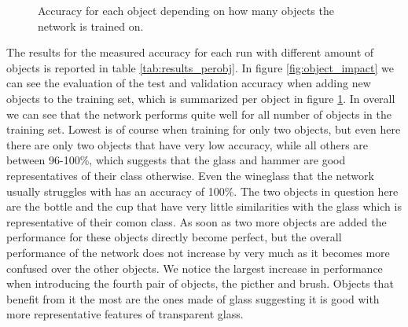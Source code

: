 \begin{figure}
	
	\caption{Accuracy for each object depending on how many objects the network is trained on.}
	\label{fig:object_impact_heatmap}
\end{figure}

The results for the measured accuracy for each run with different amount of objects is reported in table \ref{tab:results_perobj}. In figure \ref{fig:object_impact} we can see the evaluation of the test and validation accuracy when adding new objects to the training set, which is summarized per object in figure \ref{fig:object_impact_heatmap}. In overall we can see that the network performs quite well for all number of objects in the training set. Lowest is of course when training for only two objects, but even here there are only two objects that have very low accuracy, while all others are between 96-100\%, which suggests that the glass and hammer are good representatives of their class otherwise. Even the wineglass that the network usually struggles with has an accuracy of 100\%. The two objects in question here are the bottle and the cup that have very little similarities with the glass which is representative of their comon class. As soon as two more objects are added the performance for these objects directly become perfect, but the overall performance of the network does not increase by very much as it becomes more confused over the other objects. We notice the largest increase in performance when introducing the fourth pair of objects, the picther and brush. Objects that benefit from it the most are the ones made of glass suggesting it is good with more representative features of transparent glass.
